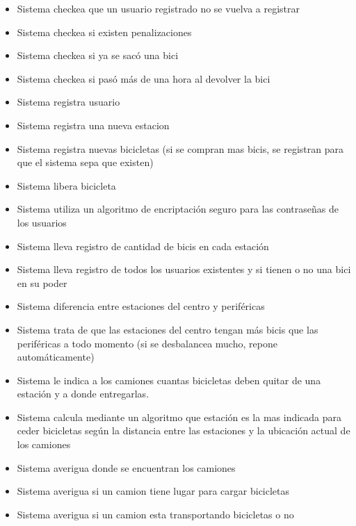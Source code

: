 \documentclass[a4paper, 10pt, twoside]{article}
\begin{document}
\begin{multicols}{2}
  \begin{itemize}
    \item Sistema checkea que un usuario registrado no se vuelva a registrar
    \item Sistema checkea si existen penalizaciones
    \item Sistema checkea si ya se sacó una bici
    \item Sistema checkea si pasó más de una hora al devolver la bici
    \item Sistema registra usuario
    \item Sistema registra una nueva estacion
    \item Sistema registra nuevas bicicletas (si se compran mas bicis, se registran para que el sistema sepa que existen)
    \item Sistema libera bicicleta
    \item Sistema utiliza un algoritmo de encriptación seguro para las contraseñas de los usuarios
    \item Sistema lleva registro de cantidad de bicis en cada estación 
    \item Sistema lleva registro de todos los usuarios existentes y si tienen o no una bici en su poder
    \item Sistema diferencia entre estaciones del centro y periféricas 
    \item Sistema trata de que las estaciones del centro tengan más bicis que las periféricas a todo momento (si se desbalancea mucho, repone automáticamente)
    \item Sistema le indica  a los camiones cuantas bicicletas deben quitar de una estación y a donde entregarlas.
    \item Sistema calcula mediante un algoritmo que estación es la mas indicada para ceder bicicletas según la distancia entre las estaciones y la ubicación actual de los camiones
    \item Sistema averigua donde se encuentran los camiones
    \item Sistema averigua si un camion tiene lugar para cargar bicicletas
    \item Sistema averigua si un camion esta transportando bicicletas o no
  \end{itemize}
\end{multicols}


\end{document}
